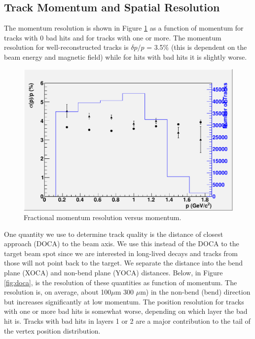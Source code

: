 \subsection{Track Momentum and Spatial Resolution}

The momentum resolution is shown in Figure \ref{fig:trkmom} as a function of momentum for tracks with 
0 bad hits and for tracks with one or more.  The momentum resolution for well-reconstructed 
tracks is $\delta p/p$ = 3.5\% (this is dependent on the beam energy and magnetic field) while for hits with bad hits it is slightly worse. 


\begin{figure}
\includegraphics[scale=0.8]{TrackingPerformance/momResvsMom.pdf}
\caption{  Fractional momentum resolution versus momentum. } 
\label{fig:trkmom}
\end{figure}


One quantity we use to determine track quality is the distance of closest approach (DOCA) 
to the beam axis.  We use this instead of the DOCA to the target beam spot since we are 
interested in long-lived decays and tracks from those will not point back to the target. 
We separate the distance into the bend plane (XOCA) and non-bend plane (YOCA) distances.  
Below, in Figure \ref{fig:doca}, is the resolution of these quantities as function of momentum.  
The resolution is, on average, about 100$\mu$m 300 $\mu$m) 
in the non-bend (bend) direction but increases significantly at low momentum.  The position 
resolution for tracks with one or more bad hits is somewhat worse, depending on which layer 
the bad hit is.  Tracks with bad hits in 
layers 1 or 2 are a major contribution to the tail of the vertex position distribution. 
    
